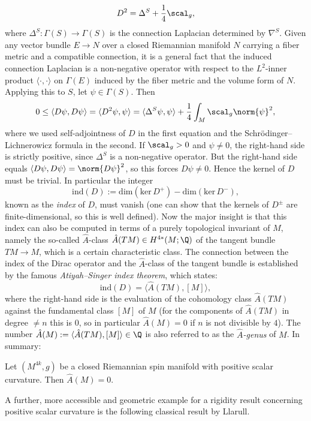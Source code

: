 \[
D^2 = \Delta^S + \frac{1}{4} \scal_g,
\]
where $\Delta^S \colon \Gamma(S) \to \Gamma(S)$ is the connection Laplacian determined by $\nabla^S$. Given any vector bundle $E \to N$ over a closed Riemannian manifold $N$ carrying a fiber metric and a compatible connection, it is a general fact that the induced connection Laplacian is a non-negative operator with respect to the $L^2$-inner product $\langle\cdot,\cdot\rangle$ on $\Gamma(E)$ induced by the fiber metric and the volume form of $N$. Applying this to $S$, let $\psi \in \Gamma(S)$. Then
\[
0 \leq \langle D\psi, D\psi \rangle = \langle D^2\psi, \psi \rangle = \langle \Delta^S\psi, \psi \rangle + \frac{1}{4} \int_M \scal_g \norm{\psi}^2,
\]
where we used self-adjointness of $D$ in the first equation and the Schrödinger--Lichnerowicz formula in the second. If $\scal_g > 0$ and $\psi \neq 0$, the right-hand side is strictly positive, since $\Delta^S$ is a non-negative operator. But the right-hand side equals $\langle D\psi,D\psi\rangle = \norm{D\psi}^2$, so this forces $D\psi \neq 0$. Hence the kernel of $D$ must be trivial. In particular the integer
\[
\mathrm{ind}(D) := \mathrm{dim}(\mathrm{ker}\,D^+) - \mathrm{dim}(\mathrm{ker}\,D^-),
\]
known as the \textit{index} of $D$, must vanish (one can show that the kernels of $D^\pm$ are finite-dimensional, so this is well defined). Now the major insight is that this index can also be computed in terms of a purely topological invariant of $M$, namely the so-called $\hat{A}$-class $\hat{A}(TM) \in H^{4\ast}(M; \Q)$ of the tangent bundle $TM \to M$, which is a certain characteristic class. The connection between the index of the Dirac operator and the $\hat{A}$-class of the tangent bundle is established by the famous \textit{Atiyah--Singer index theorem}, which states:
\[
\mathrm{ind}(D) = \langle \hat{A}(TM), [M]\rangle,
\]
where the right-hand side is the evaluation of the cohomology class $\hat{A}(TM)$ against the fundamental class $[M]$ of $M$ (for the components of $\hat{A}(TM)$ in degree $\neq n$ this is $0$, so in particular $\hat{A}(M) = 0$ if $n$ is not divisible by $4$). The number $\hat{A}(M) := \langle \hat{A}(TM), [M]\rangle \in \Q$ is also referred to as the \textit{$\hat{A}$-genus} of $M$. In summary:
\begin{theorem}[Lichnerowicz, 1963]
    Let $(M^{4k},g)$ be a closed Riemannian spin manifold with positive scalar curvature. Then $\hat{A}(M) = 0$.
\end{theorem}

A further, more accessible and geometric example for a rigidity result concerning positive scalar curvature is the following classical result by Llarull.

